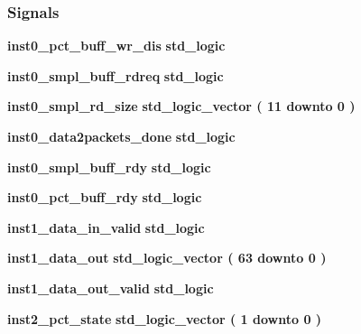 \subsubsection*{Signals}
 \begin{DoxyCompactItemize}
\item 
{\bf inst0\+\_\+pct\+\_\+buff\+\_\+wr\+\_\+dis} {\bfseries \textcolor{comment}{std\+\_\+logic}\textcolor{vhdlchar}{ }} 
\item 
{\bf inst0\+\_\+smpl\+\_\+buff\+\_\+rdreq} {\bfseries \textcolor{comment}{std\+\_\+logic}\textcolor{vhdlchar}{ }} 
\item 
{\bf inst0\+\_\+smpl\+\_\+rd\+\_\+size} {\bfseries \textcolor{comment}{std\+\_\+logic\+\_\+vector}\textcolor{vhdlchar}{ }\textcolor{vhdlchar}{(}\textcolor{vhdlchar}{ }\textcolor{vhdlchar}{ } \textcolor{vhdldigit}{11} \textcolor{vhdlchar}{ }\textcolor{keywordflow}{downto}\textcolor{vhdlchar}{ }\textcolor{vhdlchar}{ } \textcolor{vhdldigit}{0} \textcolor{vhdlchar}{ }\textcolor{vhdlchar}{)}\textcolor{vhdlchar}{ }} 
\item 
{\bf inst0\+\_\+data2packets\+\_\+done} {\bfseries \textcolor{comment}{std\+\_\+logic}\textcolor{vhdlchar}{ }} 
\item 
{\bf inst0\+\_\+smpl\+\_\+buff\+\_\+rdy} {\bfseries \textcolor{comment}{std\+\_\+logic}\textcolor{vhdlchar}{ }} 
\item 
{\bf inst0\+\_\+pct\+\_\+buff\+\_\+rdy} {\bfseries \textcolor{comment}{std\+\_\+logic}\textcolor{vhdlchar}{ }} 
\item 
{\bf inst1\+\_\+data\+\_\+in\+\_\+valid} {\bfseries \textcolor{comment}{std\+\_\+logic}\textcolor{vhdlchar}{ }} 
\item 
{\bf inst1\+\_\+data\+\_\+out} {\bfseries \textcolor{comment}{std\+\_\+logic\+\_\+vector}\textcolor{vhdlchar}{ }\textcolor{vhdlchar}{(}\textcolor{vhdlchar}{ }\textcolor{vhdlchar}{ } \textcolor{vhdldigit}{63} \textcolor{vhdlchar}{ }\textcolor{keywordflow}{downto}\textcolor{vhdlchar}{ }\textcolor{vhdlchar}{ } \textcolor{vhdldigit}{0} \textcolor{vhdlchar}{ }\textcolor{vhdlchar}{)}\textcolor{vhdlchar}{ }} 
\item 
{\bf inst1\+\_\+data\+\_\+out\+\_\+valid} {\bfseries \textcolor{comment}{std\+\_\+logic}\textcolor{vhdlchar}{ }} 
\item 
{\bf inst2\+\_\+pct\+\_\+state} {\bfseries \textcolor{comment}{std\+\_\+logic\+\_\+vector}\textcolor{vhdlchar}{ }\textcolor{vhdlchar}{(}\textcolor{vhdlchar}{ }\textcolor{vhdlchar}{ } \textcolor{vhdldigit}{1} \textcolor{vhdlchar}{ }\textcolor{keywordflow}{downto}\textcolor{vhdlchar}{ }\textcolor{vhdlchar}{ } \textcolor{vhdldigit}{0} \textcolor{vhdlchar}{ }\textcolor{vhdlchar}{)}\textcolor{vhdlchar}{ }} 

\end{DoxyCompactItemize}
